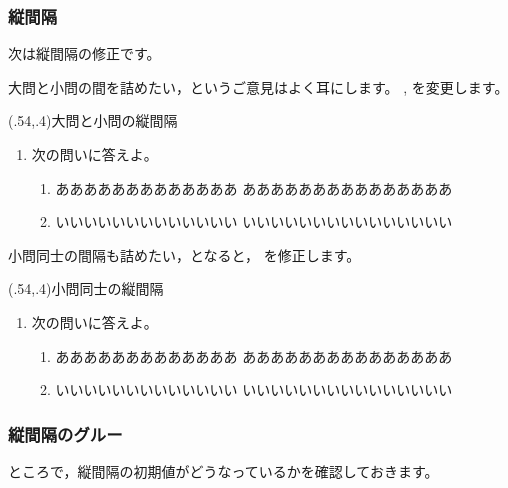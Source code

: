 \documentclass[fleqn,a4j]{jarticle}
\begin{document}
\clearpage

\subsubsection{縦間隔}
次は縦間隔の修正です。

大問と小問の間を詰めたい，というご意見はよく耳にします。
, を変更します。

\begin{showEx}(.54,.4){大問と小問の縦間隔}
\begin{enumerate}[1.~]
  \item 次の問いに答えよ。
    \begin{enumerate}%
    <apnenum={\zw%
              \zw%
              \topsep=0pt%
              \parskip=0pt%
             }>[(1)]
      \item あああああああああああああ
        あああああああああああああああ
      \item いいいいいいいいいいいいい
        いいいいいいいいいいいいいいい
    \end{enumerate}
\end{enumerate}
\end{showEx}

小問同士の間隔も詰めたい，となると，
を修正します。

\begin{showEx}(.54,.4){小問同士の縦間隔}
\begin{enumerate}[1.~]
  \item 次の問いに答えよ。
    \begin{enumerate}%
    <apnenum={\zw%
              \zw%
              \topsep=0pt%
              \parskip=0pt%
              \itemsep=0pt%
             }>[(1)]
      \item あああああああああああああ
        あああああああああああああああ
      \item いいいいいいいいいいいいい
        いいいいいいいいいいいいいいい
    \end{enumerate}
\end{enumerate}
\end{showEx}
\clearpage

\subsubsection{縦間隔のグルー}
ところで，縦間隔の初期値がどうなっているかを確認しておきます。
\end{document}
